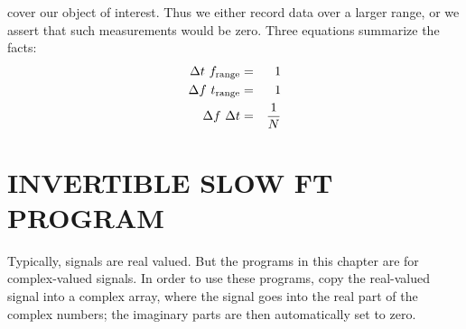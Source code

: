 cover our object of interest.
Thus we either record data over a larger range,
or we assert that such measurements would be zero.
Three equations summarize the facts:
\begin{eqnarray}
\Delta t \ f_{\rm range} &=& 1			\\
\Delta f \ t_{\rm range} &=& 1			\\
\Delta f \ \Delta t        &=& {1 \over N}
\label{eqn:dtdf}
\end{eqnarray}
\par
{}

\section{INVERTIBLE SLOW FT PROGRAM}

\par
Typically, signals are real valued.
But the programs in this chapter are for complex-valued signals.
In order to use these programs,
copy the real-valued signal into a complex array,
where the signal goes into the real part of the complex numbers;
the imaginary parts are then automatically set to zero.

